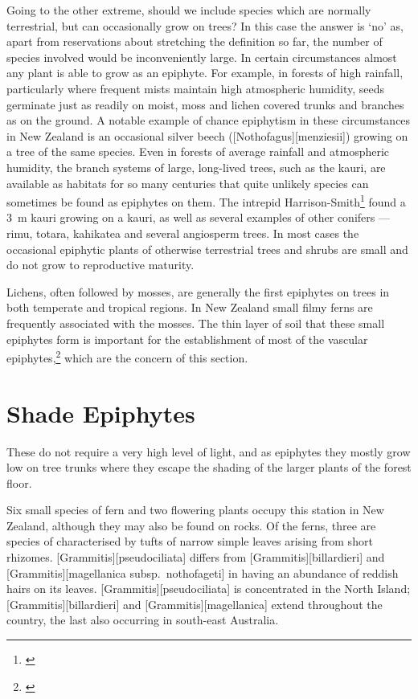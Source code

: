Going to the other extreme, should we include species which are normally terrestrial, but can occasionally grow on trees? In this case the answer is `no' as, apart from reservations about stretching the definition so far, the number of species involved would be inconveniently large.
In certain circumstances almost any plant is able to grow as an epiphyte.
For example, in forests of high rainfall, particularly where frequent mists maintain high atmospheric humidity, seeds germinate just as readily on moist, moss and lichen covered trunks and branches as on the ground.
A notable example of chance epiphytism in these circumstances in New Zealand is an occasional silver beech ([Nothofagus][menziesii]) growing on a tree of the same species.
Even in forests of average rainfall and atmospheric humidity, the branch systems of large, long-lived trees, such as the kauri, are available as habitats for so many centuries that quite unlikely species can sometimes be found as epiphytes on them.
The intrepid Harrison-Smith\footnote{\cite{harrisonsmith1938kauri}} found a \SI{3}{\metre} kauri growing on a kauri, as well as several examples of other conifers --- rimu, totara, kahikatea and several angiosperm trees.
In most cases the occasional epiphytic plants of otherwise terrestrial trees and shrubs are small and do not grow to reproductive maturity.

Lichens, often followed by mosses, are generally the first epiphytes on trees in both temperate and tropical regions.
In New Zealand small filmy ferns are frequently associated with the mosses.
The thin layer of soil that these small epiphytes form is important for the establishment of most of the vascular epiphytes,\footnote{\cite{oliver1930new}} which are the concern of this section.

\section{Shade Epiphytes}

These do not require a very high level of light, and as epiphytes they mostly grow low on tree trunks where they escape the shading of the larger plants of the forest floor.

Six small species of fern and two flowering plants occupy this station in New Zealand, although they may also be found on rocks.
Of the ferns, three are species of  characterised by tufts of narrow simple leaves arising from short rhizomes. [Grammitis][pseudociliata] differs from [Grammitis][billardieri] and [Grammitis][magellanica subsp.\ nothofageti] in having an abundance of reddish hairs on its leaves. [Grammitis][pseudociliata] is concentrated in the North Island; [Grammitis][billardieri] and [Grammitis][magellanica] extend throughout the country, the last also occurring in south-east Australia.

